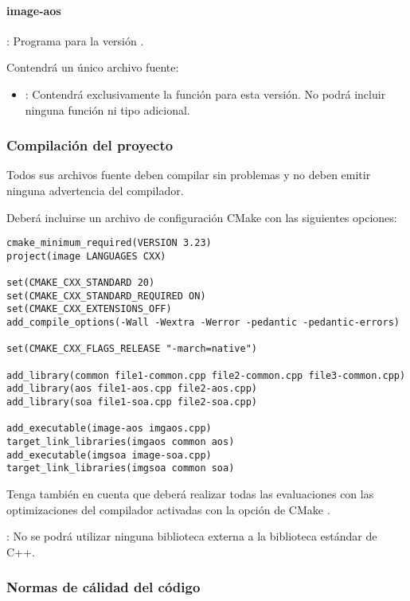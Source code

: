 \paragraph{image-aos}: Programa para la versión .

Contendrá un único archivo fuente:
\begin{itemize}
  \item {}: Contendrá exclusivamente la función
         para esta versión.
        No podrá incluir ninguna función ni tipo adicional.
\end{itemize}

\subsubsection{Compilación del proyecto}

Todos sus archivos fuente deben compilar sin problemas y no deben emitir
ninguna advertencia del compilador. 

Deberá incluirse un archivo de configuración
CMake con las siguientes opciones:

\begin{lstlisting}[title={CmakeLists.txt},frame=single]
cmake_minimum_required(VERSION 3.23)
project(image LANGUAGES CXX)

set(CMAKE_CXX_STANDARD 20)
set(CMAKE_CXX_STANDARD_REQUIRED ON)
set(CMAKE_CXX_EXTENSIONS_OFF)
add_compile_options(-Wall -Wextra -Werror -pedantic -pedantic-errors)

set(CMAKE_CXX_FLAGS_RELEASE "-march=native")

add_library(common file1-common.cpp file2-common.cpp file3-common.cpp)
add_library(aos file1-aos.cpp file2-aos.cpp)
add_library(soa file1-soa.cpp file2-soa.cpp)

add_executable(image-aos imgaos.cpp)
target_link_libraries(imgaos common aos)
add_executable(imgsoa image-soa.cpp)
target_link_libraries(imgsoa common soa)
\end{lstlisting}


Tenga también en cuenta que deberá realizar todas las evaluaciones con las
optimizaciones del compilador activadas con la opción de CMake
.


: No se podrá utilizar ninguna biblioteca externa a la 
biblioteca estándar de C++.

\subsubsection{Normas de cálidad del código}

